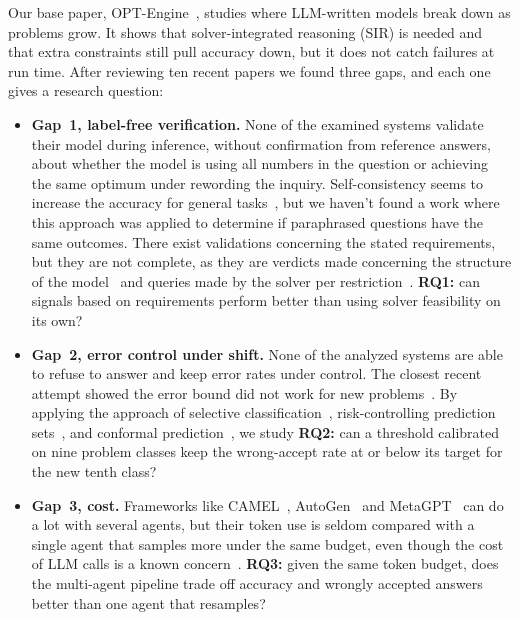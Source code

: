 \documentclass[conference]{IEEEtran}
\begin{document}
Our base paper, OPT-Engine~\cite{chen2026optengine}, studies where LLM-written models break down as problems grow. It
shows that solver-integrated reasoning (SIR) is needed and that extra constraints still pull accuracy down, but it
does not catch failures at run time. After reviewing ten recent papers we found three gaps, and each one gives a
research question:
\begin{itemize}
\item \textbf{Gap~1, label-free verification.} None of the examined systems validate their model during inference,
without confirmation from reference answers, about whether the model is using all numbers in the question or
achieving the same optimum under rewording the inquiry. Self-consistency seems to increase the accuracy for general
tasks~\cite{wang2023selfconsistency}, but we haven't found a work where this approach was applied to determine if
paraphrased questions have the same outcomes. There exist validations concerning the stated requirements, but they are
not complete, as they are verdicts made concerning the structure of the model~\cite{liu2026optverifier} and queries
made by the solver per restriction~\cite{abdulrahman2026verisimpl}. \textbf{RQ1:} can signals based on requirements
perform better than using solver feasibility on its own?
\item \textbf{Gap~2, error control under shift.} None of the analyzed systems are able to refuse to answer and keep
error rates under control. The closest recent attempt showed the error bound did not work for new
problems~\cite{lian2026admitor}. By applying the approach of selective
classification~\cite{geifman2017selective,geifman2019selectivenet,kamath2020selective}, risk-controlling prediction
sets~\cite{bates2021risk,angelopoulos2021gentle}, and conformal
prediction~\cite{vovk2005algorithmic,angelopoulos2024conformal}, we study \textbf{RQ2:} can a threshold
calibrated on nine problem classes keep the wrong-accept rate at or below its target for the new tenth class?
\item \textbf{Gap~3, cost.} Frameworks like CAMEL~\cite{li2023camel}, AutoGen~\cite{wu2023autogen} and
MetaGPT~\cite{hong2024metagpt} can do a lot with several agents, but their token use is seldom compared with a single
agent that samples more under the same budget, even though the cost of LLM calls is a known
concern~\cite{chen2024frugalgpt}. \textbf{RQ3:} given the same token budget, does the multi-agent pipeline trade off
accuracy and wrongly accepted answers better than one agent that resamples?
\end{itemize}
\end{document}
